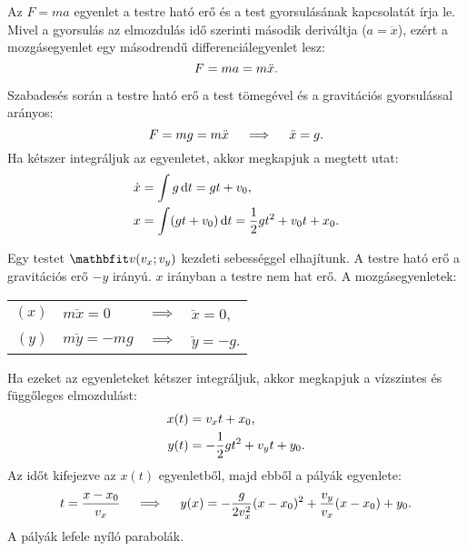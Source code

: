 \documentclass{szb-practice}
\begin{document}
\begin{blueBox}
  Az $F = ma$ egyenlet a testre ható erő és a test gyorsulásának kapcsolatát
  írja le. Mivel a gyorsulás az elmozdulás idő szerinti második deriváltja
  ($a = \ddot x$), ezért a mozgásegyenlet egy másodrendű differenciálegyenlet
  lesz:
  $$
    F = m a = m \ddot x
    \text.
  $$
\end{blueBox}

\begin{blueBox}
  Szabadesés során a testre ható erő a test tömegével és a gravitációs
  gyorsulással arányos:
  $$
    F = mg = m \ddot x
    \quad \implies \quad
    \ddot x = g
    \text.
  $$
  Ha kétszer integráljuk az egyenletet, akkor megkapjuk a megtett utat:
  \begin{align*}
    \dot x & = \int g \mathop{}\!\mathrm{d} t = gt + v_0 \text,                                \\
    x      & = \int (gt + v_0) \mathop{}\!\mathrm{d} t = \frac{1}{2} gt^2 + v_0 t + x_0 \text.
  \end{align*}
\end{blueBox}

\begin{blueBox}
  Egy testet $\rvec v(v_x; v_y)$ kezdeti sebességgel elhajítunk. A testre ható
  erő a gravitációs erő $-y$ irányú. $x$ irányban a testre nem hat erő.
  A mozgásegyenletek:
  \vspace{-1em}
  \begin{center}
    \def\arraystretch{1.5}
    \begin{tabular}{r l c l}
      $(x)$ & $m \ddot x = 0$   & $\implies$ & $\ddot x = 0$,
      \\
      $(y)$ & $m \ddot y = -mg$ & $\implies$ & $\ddot y = -g$.
    \end{tabular}
  \end{center}
  \vspace{-1em}
  Ha ezeket az egyenleteket kétszer integráljuk, akkor megkapjuk a vízszintes
  és függőleges elmozdulást:
  \begin{align*}
    x(t) & = v_x t + x_0 \text,                     \\
    y(t) & = -\frac{1}{2} gt^2 + v_y t + y_0 \text.
  \end{align*}
  Az időt kifejezve az $x(t)$ egyenletből, majd ebből a pályák egyenlete:
  $$
    t = \frac{x - x_0}{v_x}
    \quad \implies \quad
    y(x) = -\frac{g}{2 v_x^2} (x - x_0)^2 + \frac{v_y}{v_x} (x - x_0) + y_0
    \text.
  $$
  A pályák lefele nyíló parabolák.
\end{blueBox}
\end{document}
